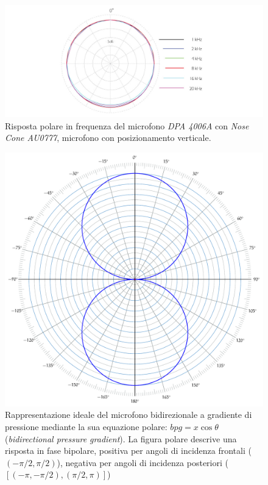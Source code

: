 \begin{figure}[h]
\centering
\includegraphics[width=1\columnwidth]{CAPITOLI/1000/IMG/4006A-ddicate-4006A-Omni-Microphone-polar-pattern-nose-cone-veritical.jpg}
\caption{Risposta polare in frequenza del microfono \emph{DPA 4006A} con \emph{Nose Cone AU0777}, microfono con posizionamento verticale.}%
\label{pol:dpa4006nose}
\end{figure}

\begin{figure}[t]
\centering
\includegraphics[width=1\columnwidth]{CAPITOLI/_TIKZ/POLAR/fig8}
\caption{Rappresentazione ideale del microfono bidirezionale a gradiente di
pressione mediante la sua equazione polare: $bpg = x\cos\theta$
(\emph{bidirectional pressure gradient}). La figura polare descrive una risposta
in fase bipolare, positiva per angoli di incidenza frontali ($(-\pi/2,\pi/2)$),
negativa per angoli di incidenza posteriori ($[(-\pi,-\pi/2),(\pi/2,\pi)]$)}
\label{polar:fig8}
\end{figure}

